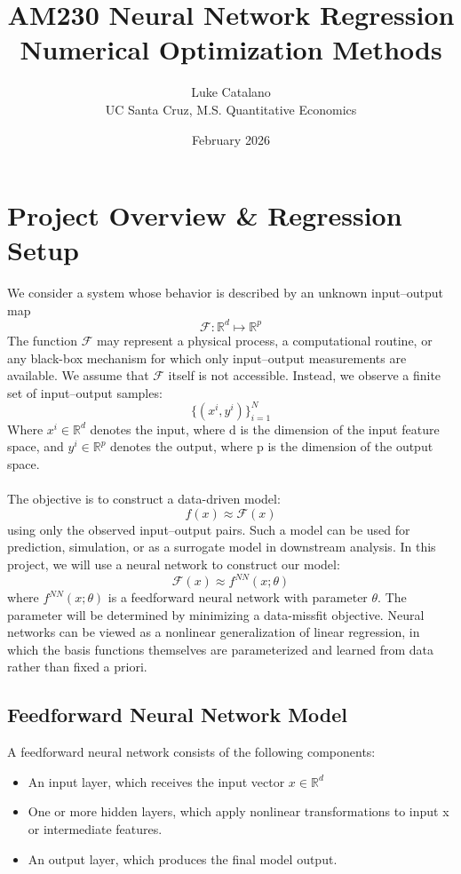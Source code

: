 \documentclass[11pt]{article}
\title{\textbf{AM230 Neural Network Regression}\\[0.25em]\Large Numerical Optimization Methods}
\author{Luke Catalano\\\small UC Santa Cruz, M.S. Quantitative Economics}
\date{February 2026}
\newcommand{\R}{\mathbb{R}}
\begin{document}
\maketitle

\section*{Project Overview \& Regression Setup}
We consider a system whose behavior is described by an unknown input–output map
\[
\mathcal{F}: \mathbb{R}^{d} \mapsto \mathbb{R}^{p}
\]
The function $\mathcal{F}$ may represent a physical process, a computational routine, or any black-box
mechanism for which only input–output measurements are available. We assume that $\mathcal{F}$
itself is not accessible. Instead, we observe a finite set of input–output samples:
\[
\{(x^i, y^i)\}^{N}_{i=1}
\]
Where $x^i \in \mathbb{R}^d$ denotes the input, where d is the dimension of the input feature space, and $y^i \in \mathbb{R}^p$ denotes the output, where p is the dimension of the output space. 
\\
\\
The objective is to construct a data-driven model:
\[
f(x) \approx \mathcal{F}(x)
\]
using only the observed input–output pairs. Such a model can be used for prediction, simulation, or as a surrogate model in downstream analysis. In this project, we will use a neural network to construct our model:
\[
\mathcal{F}(x) \approx f^{NN}(x;\theta)
\]
where $f^{NN}(x;\theta)$ is a feedforward neural network with parameter $\theta$. The parameter will be determined by minimizing a data-missfit objective. Neural
networks can be viewed as a nonlinear generalization of linear regression, in which the basis
functions themselves are parameterized and learned from data rather than fixed a priori.

\subsection*{Feedforward Neural Network Model}
A feedforward neural network consists of the following components:
\begin{itemize}
    \item An input layer, which receives the input vector $x \in \R^d$ 
    \item One or more hidden layers, which apply nonlinear transformations to input x or intermediate features. 
    \item An output layer, which produces the final model output.
\end{itemize}
\newpage
\end{document}
